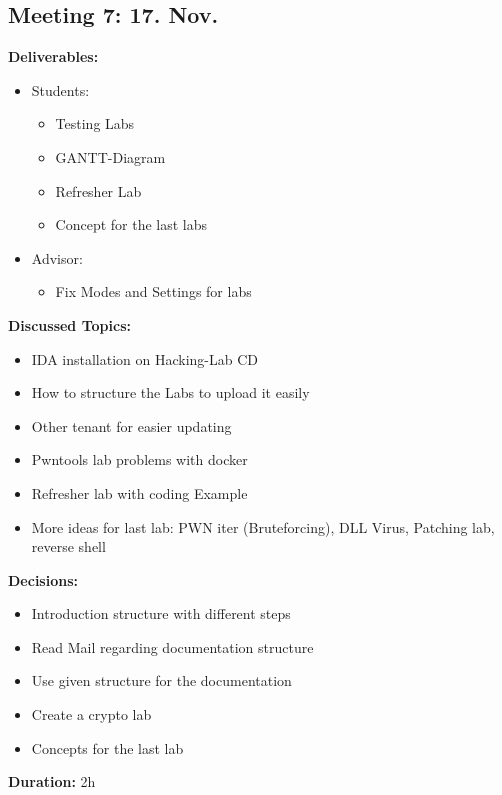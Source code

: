\subsection*{Meeting 7: 17. Nov.}
\textbf{Deliverables:}
\begin{itemize}
    \item Students:
    \begin{itemize}
        \item Testing Labs
        \item GANTT-Diagram
        \item Refresher Lab
        \item Concept for the last labs
    \end{itemize}
    \item Advisor:
    \begin{itemize}
        \item Fix Modes and Settings for labs
    \end{itemize}
\end{itemize} 
\textbf{Discussed Topics:}
\begin{itemize}
    \item IDA installation on Hacking-Lab CD
    \item How to structure the Labs to upload it easily
    \item Other tenant for easier updating
    \item Pwntools lab problems with docker
    \item Refresher lab with coding Example
    \item More ideas for last lab: PWN iter (Bruteforcing), DLL Virus, Patching lab, reverse shell
\end{itemize}
\textbf{Decisions:}
\begin{itemize}
    \item Introduction structure with different steps
    \item Read Mail regarding documentation structure
    \item Use given structure for the documentation
    \item Create a crypto lab
    \item Concepts for the last lab
\end{itemize}
\textbf{Duration:} 2h

\newpage
